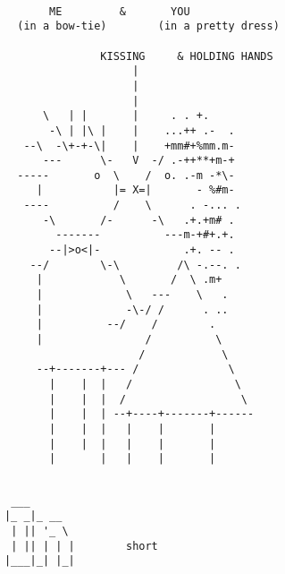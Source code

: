 \documentclass[a4paper,english]{article}
\begin{document}
\pagebreak
\color{black}

\begin{verbatim}






                                                
             ME         &       YOU             
        (in a bow-tie)        (in a pretty dress)
                 
                     KISSING     & HOLDING HANDS                  
                          |                                       
                          |                                       
                          |                                       
            \   | |       |     . . +.                            
             -\ | |\ |    |    ...++ .-  .                        
         --\  -\+-+-\|    |    +mm#+%mm.m-                        
            ---      \-   V  -/ .-++**+m-+                        
        -----       o  \    /  o. .-m -*\-                        
           |           |= X=|       - %#m-                        
         ----          /    \      . -... .                       
            -\       /-      -\   .+.+m# .                        
              -------          ---m-+#+.+.                        
             --|>o<|-             .+. -- .                        
          --/        \-\         /\ -.--. .                       
           |            \       /  \ .m+                          
           |             \   ---    \   .                         
           |             -\-/ /      . ..                         
           |          --/    /        .                           
           |                /          \                          
                           /            \                         
           --+-------+--- /              \                         
             |    |  |   /                \     
             |    |  |  /                  \    
             |    |  | --+----+-------+------   
             |    |  |   |    |       |         
             |    |  |   |    |       |         
             |       |   |    |       |         
                                                 
\end{verbatim}
\pagebreak
\begin{verbatim}
       ___                      
      |_ _|_ __                 
       | || '_ \                
       | || | | |        short
      |___|_| |_|               
\end{verbatim}
\end{document}
